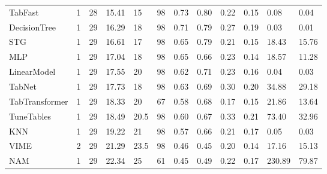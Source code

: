 \begin{tabular}{lllllrllllll}
TabFast & 1 & 28 & 15.41 & 15 & 98 & 0.73 & 0.80 & 0.22 & 0.15 & 0.08 & 0.04 \\
DecisionTree & 1 & 29 & 16.29 & 18 & 98 & 0.71 & 0.79 & 0.27 & 0.19 & 0.03 & 0.01 \\
STG & 1 & 29 & 16.61 & 17 & 98 & 0.65 & 0.79 & 0.21 & 0.15 & 18.43 & 15.76 \\
MLP & 1 & 29 & 17.04 & 18 & 98 & 0.65 & 0.66 & 0.23 & 0.14 & 18.57 & 11.28 \\
LinearModel & 1 & 29 & 17.55 & 20 & 98 & 0.62 & 0.71 & 0.23 & 0.16 & 0.04 & 0.03 \\
TabNet & 1 & 29 & 17.73 & 18 & 98 & 0.63 & 0.69 & 0.30 & 0.20 & 34.88 & 29.18 \\
TabTransformer & 1 & 29 & 18.33 & 20 & 67 & 0.58 & 0.68 & 0.17 & 0.15 & 21.86 & 13.64 \\
TuneTables & 1 & 29 & 18.49 & 20.5 & 98 & 0.60 & 0.67 & 0.33 & 0.21 & 73.40 & 32.96 \\
KNN & 1 & 29 & 19.22 & 21 & 98 & 0.57 & 0.66 & 0.21 & 0.17 & 0.05 & 0.03 \\
VIME & 2 & 29 & 21.29 & 23.5 & 98 & 0.46 & 0.45 & 0.20 & 0.14 & 17.16 & 15.13 \\
NAM & 1 & 29 & 22.34 & 25 & 61 & 0.45 & 0.49 & 0.22 & 0.17 & 230.89 & 79.87 \\
\bottomrule
\end{tabular}
